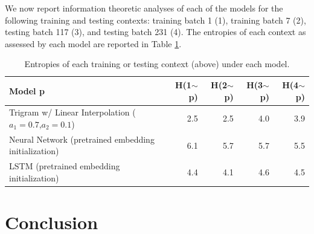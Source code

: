 \documentclass[11pt]{article}
\begin{document}
We now report information theoretic analyses of each of the models for the following training and testing contexts: training batch 1 (1), training batch 7 (2), testing batch 117 (3), and testing batch 231 (4). The entropies of each context as assessed by each model are reported in Table \ref{tab:entropies}.

\begin{table}[h]
  \centering
  \begin{tabular}{@{}lrrrr@{}}
  \toprule
  \textbf{Model p} & \textbf{H(1$\sim$p)} & \textbf{H(2$\sim$p)} & \textbf{H(3$\sim$p)} & \textbf{H(4$\sim$p)} \\ \midrule
  Trigram w/ Linear Interpolation ($a_1=0.7$,$a_2=0.1$) & 2.5 & 2.5 & 4.0 & 3.9 \\
  Neural Network (pretrained embedding initialization) & 6.1 & 5.7 & 5.7 & 5.5 \\
  LSTM (pretrained embedding initialization) & 4.4 & 4.1 & 4.6 & 4.5 \\
  \bottomrule
  \end{tabular}
  \caption{Entropies of each training or testing context (above) under each model.}
  \label{tab:entropies}
\end{table}

\section{Conclusion}
\end{document}
